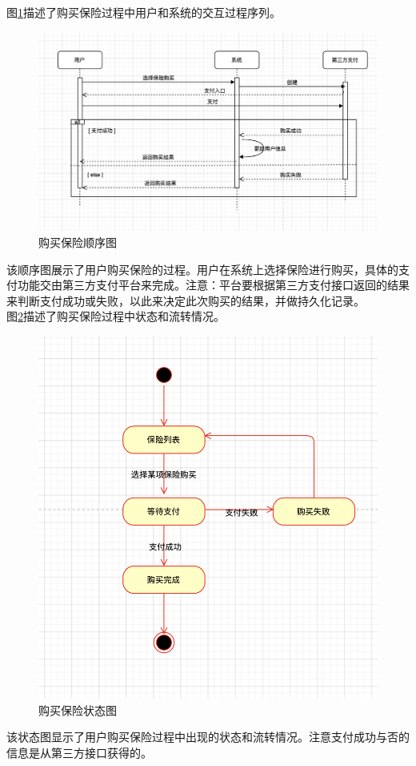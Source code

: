 \documentclass[a4paper]{ctexart}
\begin{document}
图\ref{fig:购买保险顺序图}描述了购买保险过程中用户和系统的交互过程序列。
\begin{figure}[H]
\centering
\includegraphics[scale=0.5]{image/1_3顺序图.png}
\caption{购买保险顺序图}
\label{fig:购买保险顺序图}
\end{figure}
该顺序图展示了用户购买保险的过程。用户在系统上选择保险进行购买，具体的支付功能交由第三方支付平台来完成。注意：平台要根据第三方支付接口返回的结果来判断支付成功或失败，以此来决定此次购买的结果，并做持久化记录。\\

图\ref{fig:购买保险状态图}描述了购买保险过程中状态和流转情况。
\begin{figure}[H]
\centering
\includegraphics[scale=0.3]{image/1_9状态图.png}
\caption{购买保险状态图}
\label{fig:购买保险状态图}
\end{figure}
该状态图显示了用户购买保险过程中出现的状态和流转情况。注意支付成功与否的信息是从第三方接口获得的。
\end{document}
